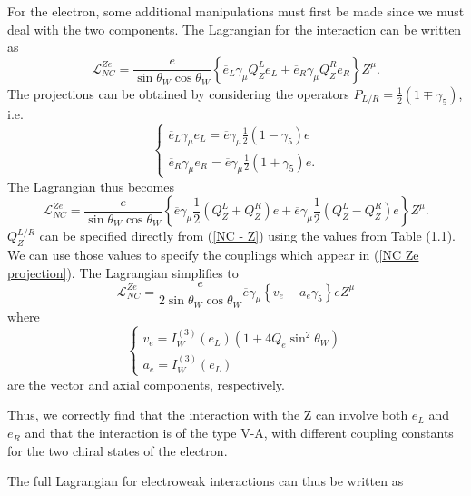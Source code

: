 \documentclass[10pt,a4paper]{book}
\begin{document}
For the electron, some additional manipulations must first be made since we must deal with the two components. The Lagrangian for the interaction can be written as
\begin{equation}
\mathcal{L}_{NC}^{Ze} = \frac{e}{\sin\theta_W\cos\theta_W}\left\lbrace \overline{e}_L \gamma_\mu Q_Z^L e_L + \overline{e}_R \gamma_\mu Q_Z^R e_R  \right\rbrace Z^\mu.
\end{equation}
The projections can be obtained by considering the operators $P_{L/R} = \frac{1}{2}\left(1 \mp \gamma_5\right)$, i.e.
\begin{equation}
\begin{cases}
\overline{e}_L \gamma_\mu e_L = \overline{e} \gamma_\mu \frac{1}{2}\left(1-\gamma_5\right)e \\
\overline{e}_R \gamma_\mu e_R = \overline{e} \gamma_\mu \frac{1}{2}\left(1+\gamma_5\right)e .
\end{cases}
\end{equation}
The Lagrangian thus becomes
\begin{equation}
\label{NC Ze projection}
\mathcal{L}_{NC}^{Ze} = \frac{e}{\sin\theta_W\cos\theta_W}\left\lbrace \overline{e}\gamma_\mu\frac{1}{2}(Q^L_Z + Q^R_Z)e + \overline{e}\gamma_\mu\frac{1}{2}(Q^L_Z - Q^R_Z)e  \right\rbrace Z^\mu.
\end{equation}
$Q_Z^{L/R}$ can be specified directly from (\ref{NC - Z}) using the values from Table (1.1). We can use those values to specify the couplings which appear in (\ref{NC Ze projection}). The Lagrangian simplifies to
\begin{equation}
\mathcal{L}^{Ze}_{NC} = \frac{e}{2\sin\theta_W\cos\theta_W} \overline{e}\gamma_\mu \left\lbrace v_e - a_e \gamma_5\right\rbrace e Z^\mu
\end{equation} 
where
\begin{equation}
\begin{cases}
v_e = I^{(3)}_W (e_L) \left( 1 + 4Q_e\sin^2\theta_W \right) \\
a_e = I^{(3)}_W (e_L)
\end{cases}
\end{equation}
are the vector and axial components, respectively. 

Thus, we correctly find that the interaction with the Z can involve both $e_L$ and $e_R$ and that the interaction is of the type V-A, with different coupling constants for the two chiral states of the electron. 

The full Lagrangian for electroweak interactions can thus be written as
\end{document}
